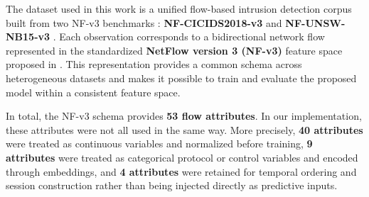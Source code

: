 \documentclass[12pt, a4paper]{report}
\begin{document}
The dataset used in this work is a unified flow-based intrusion detection corpus built from two NF-v3 benchmarks : \textbf{NF-CICIDS2018-v3}\cite{NF3_IDS2018} and \textbf{NF-UNSW-NB15-v3} \cite{NF-UNSW-NB15-v3}. Each observation corresponds to a bidirectional network flow represented in the standardized \textbf{NetFlow version 3 (NF-v3)} feature space proposed in \cite{NF3-2025}. This representation provides a common schema across heterogeneous  datasets and makes it possible to train and evaluate the proposed model within a consistent feature space.

In total, the NF-v3 schema provides \textbf{53 flow attributes}. In our implementation, these attributes were not all used in the same way. More precisely, \textbf{40 attributes} were treated as continuous variables and normalized before training, \textbf{9 attributes} were treated as categorical protocol or control variables and encoded through embeddings, and \textbf{4 attributes} were retained for temporal ordering and session construction rather than being injected directly as predictive inputs. 
\end{document}
